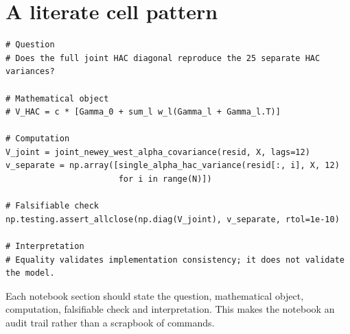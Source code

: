 \hypertarget{a-literate-cell-pattern}{%
\section{A literate cell pattern}\label{a-literate-cell-pattern}}

\begin{verbatim}
# Question
# Does the full joint HAC diagonal reproduce the 25 separate HAC variances?

# Mathematical object
# V_HAC = c * [Gamma_0 + sum_l w_l(Gamma_l + Gamma_l.T)]

# Computation
V_joint = joint_newey_west_alpha_covariance(resid, X, lags=12)
v_separate = np.array([single_alpha_hac_variance(resid[:, i], X, 12)
                       for i in range(N)])

# Falsifiable check
np.testing.assert_allclose(np.diag(V_joint), v_separate, rtol=1e-10)

# Interpretation
# Equality validates implementation consistency; it does not validate the model.
\end{verbatim}

Each notebook section should state the question, mathematical object,
computation, falsifiable check and interpretation. This makes the
notebook an audit trail rather than a scrapbook of commands.

